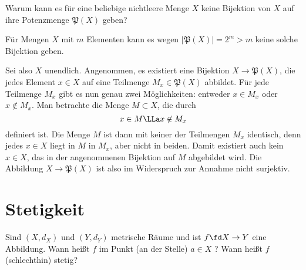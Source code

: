 \begin{frage}\label{03_upot}
  Warum kann es für eine beliebige nichtleere Menge $X$ keine Bijektion 
  von $X$ auf ihre Potenzmenge $\mathfrak{P}(X)$ geben?
\end{frage}

\begin{antwort}
  Für  Mengen $X$ mit $m$ Elementen 
  kann es wegen $| \mathfrak{P}(X) | =2^m > m$ keine solche Bijektion geben.  

  Sei also $X$ unendlich. Angenommen, 
  es existiert eine Bijektion $X\to \mathfrak{P}(X)$, die 
  jedes Element $x\in X$ auf eine Teilmenge 
  $M_x \in \mathfrak{P}(X)$ abbildet. 
  Für jede Teilmenge $M_x$ gibt es 
  nun genau zwei Möglichkeiten: entweder $x \in M_x$ oder 
  $x\not\in M_x$. Man betrachte die Menge $M\subset X$, 
  die durch 
  \[
  x \in  M \LLa x\not\in M_x
  \]
  definiert ist. Die Menge $M$ ist dann mit keiner der Teilmengen 
  $M_x$ identisch, denn jedes $x\in X$ liegt  in $M$ 
   in $M_x$, aber nicht in beiden. 
  Damit existiert auch kein $x\in X$, das in der angenommenen Bijektion auf 
  $M$ abgebildet wird. Die Abbildung 
  $X\to \mathfrak{P}(X)$ ist also im Widerspruch zur Annahme nicht surjektiv.
  \AntEnd
\end{antwort} 

\section{Stetigkeit}

\begin{frage}\label{03_epde}
  Sind $(X,d_X)$ und $(Y,d_Y)$ metrische Räume und ist 
  $f\fd X\to Y$ eine Abbildung. Wann heißt $f$ im Punkt 
  (an der Stelle) $a\in X$ 
  ? Wann heißt $f$ (schlechthin) stetig?
\end{frage}

